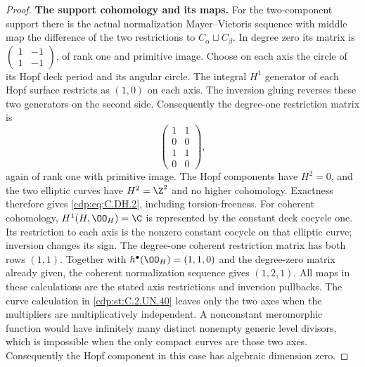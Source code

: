 \begin{proof}
\par\medskip\noindent\textbf{The support cohomology and its maps.}
For the two-component
support there is the
actual normalization
Mayer--Vietoris sequence
with middle map the
difference of the two
restrictions to
$C_\alpha\sqcup C_\beta$.
In degree zero its
matrix is
$\left(\begin{smallmatrix}1&-1\\1&-1\end{smallmatrix}\right)$,
of rank one and
primitive image.
Choose on each axis
the circle of its
Hopf deck period and
its angular circle.
The integral $H^1$
generator of each
Hopf surface restricts
as $(1,0)$ on each
axis. The inversion
gluing reverses these
two generators on
the second side.
Consequently the
degree-one restriction
matrix is
\[
                     \begin{pmatrix}
                       1&1\\0&0\\1&1\\0&0
                     \end{pmatrix},                \tag{C.DH.16}\label{cdp:eq:C.DH.16}
\]
again of rank one
with primitive image.
The Hopf components
have $H^2=0$, and
the two elliptic
curves have $H^2=\Z^2$
and no higher
cohomology. Exactness
therefore gives
\eqref{cdp:eq:C.DH.2}, including
torsion-freeness.
For coherent cohomology,
$H^1(H,\OO_H)=\C$
is represented by
the constant deck
cocycle one. Its
restriction to each
axis is the nonzero
constant cocycle on
that elliptic curve;
inversion changes
its sign. The
degree-one coherent
restriction matrix
has both rows $(1,1)$.
Together with
$h^\bullet(\OO_H)=(1,1,0)$
and the degree-zero
matrix already given,
the coherent
normalization sequence
gives $(1,2,1)$.
All maps in these
calculations are
the stated axis
restrictions and
inversion pullbacks.
The curve calculation in \ref{cdp:st:C.2.UN.40} leaves only the two axes when
the multipliers are multiplicatively independent. A nonconstant meromorphic
function would have infinitely many distinct nonempty generic level divisors,
which is impossible when the only compact curves are those two axes.
Consequently the Hopf component in this case has algebraic dimension zero.

\end{proof}


